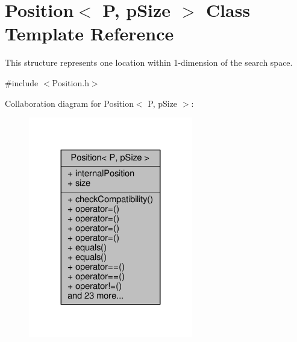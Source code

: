 \hypertarget{structPosition}{}\section{Position$<$ P, p\+Size $>$ Class Template Reference}
\label{structPosition}


This structure represents one location within 1-\/dimension of the search space.  




{\ttfamily \#include $<$Position.\+h$>$}



Collaboration diagram for Position$<$ P, p\+Size $>$\+:
\nopagebreak
\begin{figure}[H]
\begin{center}
\leavevmode
\includegraphics[width=203pt]{structPosition__coll__graph}
\end{center}
\end{figure}
